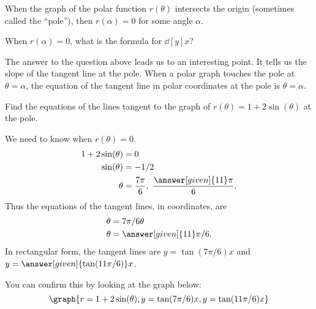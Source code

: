 \documentclass{ximera}
\begin{document}
When the graph of the polar function $r(\theta)$ intersects the origin
(sometimes called the ``pole''), then $r(\alpha)=0$ for some angle
$\alpha$.

\begin{question}
  When $r(\alpha) = 0$, what is the formula for $\dd[y]{x}$?
\begin{multipleChoice} 
\end{multipleChoice}
\end{question}
The answer to the question above leads us to an interesting point. It
tells us the slope of the tangent line at the pole.  When a polar
graph touches the pole at $\theta=\alpha$, the equation of the tangent
line in polar coordinates at the pole is $\theta=\alpha$.


\begin{example}
  Find the equations of the lines tangent to the graph of
  $r(\theta)=1+2\sin(\theta)$ at the pole.
  \begin{explanation}
    We need to know when $r(\theta)=0$.
    \begin{align*}
      1+2\sin(\theta) &= 0\\
      \sin(\theta) &= -1/2\\
      \theta &= \frac{7\pi}{6},\ \frac{\answer[given]{11}\pi}6.
    \end{align*}
    Thus the equations of the tangent lines, in  coordinates, are
    \begin{align*}
      \theta &=7\pi/6 \theta \\
      \theta &= \answer[given]{11}\pi/6.
    \end{align*}
    In rectangular form, the tangent lines are $y=\tan(7\pi/6)x$ and
    $y=\answer[given]{\tan(11\pi/6)}x$.
    \begin{prompt}
     You can confirm this by looking at the graph below:
     \[
     \graph{r=1+2\sin(\theta),y=\tan(7\pi/6)x,y=\tan(11\pi/6)x}
     \]
   \end{prompt}
  \end{explanation}
\end{example}
\end{document}
